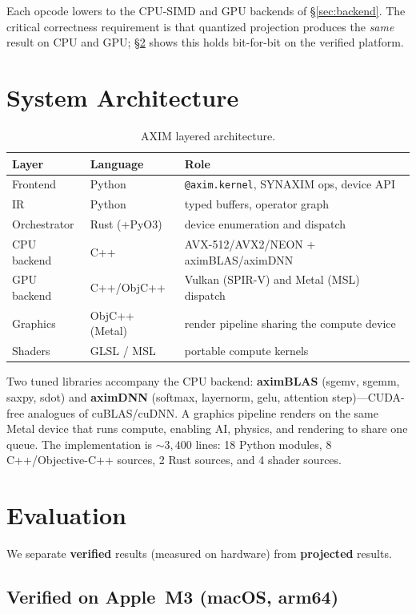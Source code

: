 \documentclass[11pt,a4paper]{article}
\begin{document}
Each opcode lowers to the CPU-SIMD and GPU backends of \S\ref{sec:backend}. The critical
correctness requirement is that quantized projection produces the \emph{same} result on CPU
and GPU; \S\ref{sec:eval} shows this holds bit-for-bit on the verified platform.

\section{System Architecture}

\begin{table}[H]
\centering
\begin{tabular}{@{}lll@{}}
\toprule
Layer & Language & Role \\ \midrule
Frontend & Python & \texttt{@axim.kernel}, SYNAXIM ops, device API \\
IR & Python & typed buffers, operator graph \\
Orchestrator & Rust (+PyO3) & device enumeration and dispatch \\
CPU backend & C++ & AVX-512/AVX2/NEON + aximBLAS/aximDNN \\
GPU backend & C++/ObjC++ & Vulkan (SPIR-V) and Metal (MSL) dispatch \\
Graphics & ObjC++ (Metal) & render pipeline sharing the compute device \\
Shaders & GLSL / MSL & portable compute kernels \\ \bottomrule
\end{tabular}
\caption{AXIM layered architecture.}
\end{table}

Two tuned libraries accompany the CPU backend: \textbf{aximBLAS} (sgemv, sgemm, saxpy, sdot)
and \textbf{aximDNN} (softmax, layernorm, gelu, attention step)---CUDA-free analogues of
cuBLAS/cuDNN. A graphics pipeline renders on the same Metal device that runs compute,
enabling AI, physics, and rendering to share one queue. The implementation is ${\sim}3{,}400$
lines: 18 Python modules, 8 C++/Objective-C++ sources, 2 Rust sources, and 4 shader sources.

\section{Evaluation}\label{sec:eval}

We separate \textbf{verified} results (measured on hardware) from \textbf{projected} results.

\subsection{Verified on Apple~M3 (macOS, arm64)}
\end{document}
